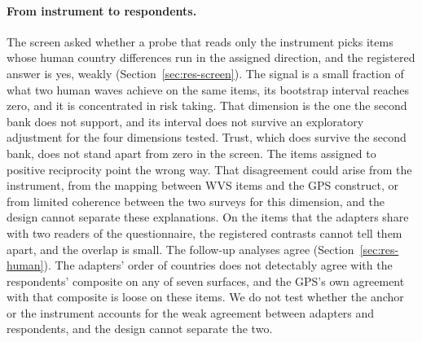 \paragraph{From instrument to respondents.} The screen asked whether a probe that reads only the instrument picks items whose human country differences run in the assigned direction, and the registered answer is yes, weakly (Section~\ref{sec:res-screen}). The signal is a small fraction of what two human waves achieve on the same items, its bootstrap interval reaches zero, and it is concentrated in risk taking. That dimension is the one the second bank does not support, and its interval does not survive an exploratory adjustment for the four dimensions tested. Trust, which does survive the second bank, does not stand apart from zero in the screen. The items assigned to positive reciprocity point the wrong way. That disagreement could arise from the instrument, from the mapping between WVS items and the GPS construct, or from limited coherence between the two surveys for this dimension, and the design cannot separate these explanations. On the items that the adapters share with two readers of the questionnaire, the registered contrasts cannot tell them apart, and the overlap is small. The follow-up analyses agree (Section~\ref{sec:res-human}). The adapters' order of countries does not detectably agree with the respondents' composite on any of seven surfaces, and the GPS's own agreement with that composite is loose on these items. We do not test whether the anchor or the instrument accounts for the weak agreement between adapters and respondents, and the design cannot separate the two.

